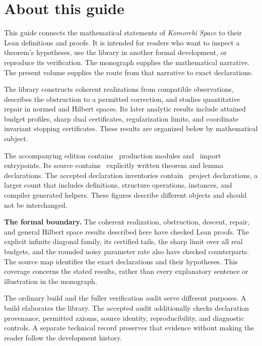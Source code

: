 \documentclass[11pt]{article}
\begin{document}
\KomorebiCover
\section*{About this guide}
This guide connects the mathematical statements of \emph{Komorebi Space} to their Lean definitions and proofs. It is intended for readers who want to inspect a theorem's hypotheses, use the library in another formal development, or reproduce its verification. The monograph supplies the mathematical narrative. The present volume supplies the route from that narrative to exact declarations.

The library constructs coherent realizations from compatible observations, describes the obstruction to a permitted correction, and studies quantitative repair in normed and Hilbert spaces. Its later analytic results include attained budget profiles, sharp dual certificates, regularization limits, and coordinate invariant stopping certificates. These results are organized below by mathematical subject.

The accompanying edition contains \EditionProductionModules\ production modules and \EditionEntrypoints\ import entrypoints. Its source contains \EditionExplicitTheorems\ explicitly written theorem and lemma declarations. The accepted declaration inventories contain \EditionExportedDeclarations\ project declarations, a larger count that includes definitions, structure operations, instances, and compiler generated helpers. These figures describe different objects and should not be interchanged.

\begin{scopebox}
\textbf{The formal boundary.} The coherent realization, obstruction, descent, repair, and general Hilbert space results described here have checked Lean proofs. The explicit infinite diagonal family, its certified tails, the sharp limit over all real budgets, and the rounded noisy parameter rate also have checked counterparts. The source map identifies the exact declarations and their hypotheses. This coverage concerns the stated results, rather than every explanatory sentence or illustration in the monograph.
\end{scopebox}

The ordinary build and the fuller verification audit serve different purposes. A build elaborates the library. The accepted audit additionally checks declaration provenance, permitted axioms, source identity, reproducibility, and diagnostic controls. A separate technical record preserves that evidence without making the reader follow the development history.
\end{document}
